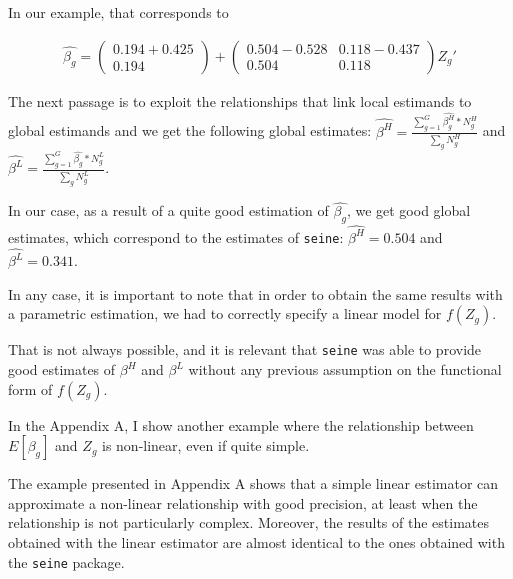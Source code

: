 In our example, that corresponds to

\begin{align*}
    \hat{\beta_g}=\begin{pmatrix}
        0.194+0.425 \\
        0.194
        \end{pmatrix} +
        \begin{pmatrix}
        0.504-0.528 & 0.118-0.437\\ 
        0.504 & 0.118
    \end{pmatrix} Z_g'
\end{align*}

The next passage is to exploit the relationships that link local estimands to global estimands and we get the following global estimates: $\hat{\beta^H} = \frac{\sum_{g=1}^G \hat{\beta^H_g}*N^H_g}{\sum_g N^H_g}$ and $\hat{\beta^L} = \frac{\sum_{g=1}^G \hat{\beta_g}*N_g^L}{\sum_g N_g^L}$.

In our case, as a result of a quite good estimation of $\hat{\beta_g}$, we get good global estimates, which correspond to the estimates of \texttt{seine}: $\hat{\beta^H} = 0.504$ and $\hat{\beta^L}=0.341$.



In any case, it is important to note that in order to obtain the same results with a parametric estimation, we had to correctly specify a linear model for $f(Z_g)$.

That is not always possible, and it is relevant that \texttt{seine} was able to provide good estimates of $\beta^H$ and $\beta^L$ without any previous assumption on the functional form of $f(Z_g)$.

In the Appendix A, I show another example where the relationship between $E[\beta_g]$ and $Z_g$ is non-linear, even if quite simple.

The example presented in Appendix A shows that a simple linear estimator can approximate a non-linear relationship with good precision, at least when the relationship is not particularly complex. Moreover, the results of the estimates obtained with the linear estimator are almost identical to the ones obtained with the \texttt{seine} package.



